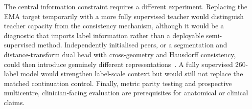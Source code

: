 The central information constraint requires a different experiment. Replacing the EMA target
temporarily with a more fully supervised teacher would distinguish teacher capacity from the
consistency mechanism, although it would be a diagnostic that imports label information rather
than a deployable semi-supervised method. Independently initialised peers, or a segmentation and
distance-transform dual head with cross-geometry and Hausdorff consistency, could then introduce
genuinely different representations~\cite{zhu2024crossgeometry}. A fully supervised 260-label
model would strengthen label-scale context but would still not replace the matched continuation
control. Finally, metric parity testing and prospective multicentre, clinician-facing evaluation
are prerequisites for anatomical or clinical claims.
